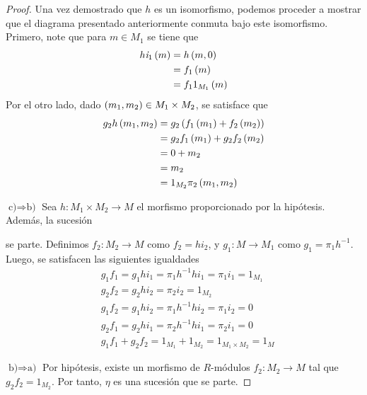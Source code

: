 \documentclass{article}
\begin{document}
\begin{enumerate}[label=\textbf{Ej \arabic*.}]
\begin{proof}
			Una vez demostrado que $h$ es un isomorfismo, podemos proceder a mostrar que el diagrama presentado anteriormente conmuta bajo este isomorfismo. Primero, note que para $m \in M_{1}$ se tiene que 
			\begin{align*}
				h\textit{i}_{1}\left(m\right)&=h\left(m,0\right)\\
				&=f_{1}\left(m\right)\\
				&=f_{1}1_{M_{1}}\left(m\right)
			\end{align*}
			Por el otro lado, dado $\left(m_{1},m_{2}\right) \in M_{1} \times M_{2}$, se satisface que
			\begin{align*}
				g_{2}h\left(m_{1},m_{2}\right)&=g_{2}\left(f_{1}\left(m_{1}\right)+f_{2}\left(m_{2}\right)\right)\\
				&=g_{2}f_{1}\left(m_{1}\right)+g_{2}f_{2}\left(m_{2}\right)\\
				&=0+m_{2}\\
				&=m_{2}\\
				&=1_{M_{2}}\pi_{2}\left(m_{1},m_{2}\right)
			\end{align*}
			
			$\boxed{\text{c)}\Rightarrow\text{b)}}$ Sea $h:M_{1} \times M_{2} \longrightarrow M$ el morfismo proporcionado por la hipótesis. Además, la sucesión
			se parte. Definimos $f_{2}:M_{2} \longrightarrow M$ como $f_{2}=hi_{2}$, y $g_{1}:M \longrightarrow M_{1}$ como $g_{1}=\pi_{1}h^{-1}$.\\
			
			Luego, se satisfacen las siguientes igualdades
			\begin{align*}
				& g_{1}f_{1}=g_{1}hi_{1}=\pi_{1}h^{-1}hi_{1}=\pi_{1}i_{1}=1_{M_{1}}\\
				& g_{2}f_{2}=g_{2}hi_{2}=\pi_{2}i_{2}=1_{M_{2}}\\
				& g_{1}f_{2}=g_{1}hi_{2}=\pi_{1}h^{-1}hi_{2}=\pi_{1}i_{2}=0\\
				& g_{2}f_{1}=g_{2}hi_{1}=\pi_{2}h^{-1}hi_{1}=\pi_{2}i_{1}=0\\
				& g_{1}f_{1}+g_{2}f_{2}=1_{M_{1}}+1_{M_{2}}=1_{M_{1} \times M_{2}}=1_{M}
			\end{align*}
			
			$\boxed{\text{b)}\Rightarrow\text{a)}}$ Por hipótesis, existe un morfismo de $R$-módulos $f_{2}:M_{2} \longrightarrow M$ tal que $g_{2}f_{2}=1_{M_{2}}$. Por tanto, $\eta$ es una sucesión que se parte.
		\end{proof}


\end{enumerate}
\end{document}
